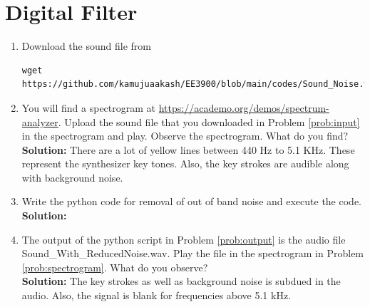 \documentclass[journal,12pt,twocolumn]{IEEEtran}
\newcommand{\solution}{\noindent \textbf{Solution: }}
\numberwithin{equation}{section}
\renewcommand\thesection{\arabic{section}}
\begin{document}
\section{Digital Filter}
\begin{enumerate}[label=\thesection.\arabic*
,ref=\thesection.\theenumi]
\item
\label{prob:input}
Download the sound file from  
\begin{lstlisting}
wget https://github.com/kamujuaakash/EE3900/blob/main/codes/Sound_Noise.wav
\end{lstlisting}
\item
\label{prob:spectrogram}
You will find a spectrogram at \href{https://academo.org/demos/spectrum-analyzer}{\url{https://academo.org/demos/spectrum-analyzer}}. 
%
Upload the sound file that you downloaded in Problem \ref{prob:input} in the spectrogram  and play.  Observe the spectrogram. What do you find?
\\
%
\solution There are a lot of yellow lines between 440 Hz to 5.1 KHz.  These represent the synthesizer key tones. Also, the key strokes
are audible along with background noise.
\item
\label{prob:output}
Write the python code for removal of out of band noise and execute the code.
\\
\solution

%
\item
The output of the python script in Problem \ref{prob:output} is the audio file Sound\_With\_ReducedNoise.wav. Play the file in the spectrogram in Problem \ref{prob:spectrogram}. What do you observe?
\\
\solution The key strokes as well as background noise is subdued in the audio.  Also,  the signal is blank for frequencies above 5.1 kHz.

\end{enumerate}
\end{document}
